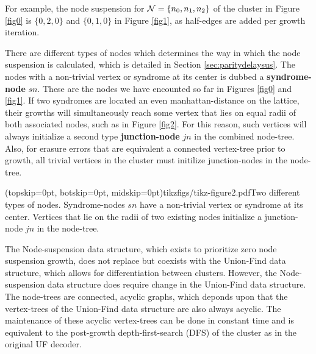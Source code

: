 For example, the node suspension for $\mathcal{N} = \{n_0, n_1, n_2\}$ of the cluster in Figure \ref{fig0} is $\{0, 2, 0\}$ and $\{0, 1, 0\}$ in Figure \ref{fig1}, as half-edges are added per growth iteration. 

There are different types of nodes which determines the way in which the node suspension is calculated, which is detailed in Section \ref{sec:paritydelaysus}. The nodes with a non-trivial vertex or syndrome at its center is dubbed a \textbf{syndrome-node} $sn$. These are the nodes we have encounted so far in Figures \ref{fig0} and \ref{fig1}. If two syndromes are located an even manhattan-distance on the lattice, their growths will simultaneously reach some vertex that lies on equal radii of both associated nodes, such as in Figure \ref{fig2}. For this reason, such vertices will always initialize a second type \textbf{junction-node} $jn$ in the combined node-tree. Also, for erasure errors that are equivalent a connected vertex-tree prior to growth, all trivial vertices in the cluster must initilize junction-nodes in the node-tree.

\Figure[htb](topskip=0pt, botskip=0pt, midskip=0pt){tikzfigs/tikz-figure2.pdf}{Two different types of nodes. Syndrome-nodes $sn$ have a non-trivial vertex or syndrome at its center. Vertices that lie on the radii of two existing nodes initialize a junction-node $jn$ in the node-tree.\label{fig2}}

The Node-suspension data structure, which exists to prioritize zero node suspension growth, does not replace but coexists with the Union-Find data structure, which allows for differentiation between clusters. However, the Node-suspension data structure does require change in the Union-Find data structure. The node-trees are connected, acyclic graphs, which deponds upon that the vertex-trees of the Union-Find data structure are also always acyclic. The maintenance of these acyclic vertex-trees can be done in constant time and is equivalent to the post-growth depth-first-search (DFS) of the cluster as in the original UF decoder. 
